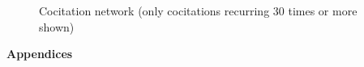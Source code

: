 \documentclass[a4paper]{article}
\begin{document}
\clearpage

\begin{figure}[p]
\caption{Cocitation network (only cocitations recurring 30 times or more shown)}
\end{figure}

\clearpage

\setcounter{secnumdepth}{0}

{\centering
\vspace*{\fill}
{\huge \bfseries Appendices\par}
\rule{0pt}{10ex}
\vspace*{\fill}
} %
\thispagestyle{empty}
\clearpage
\end{document}
